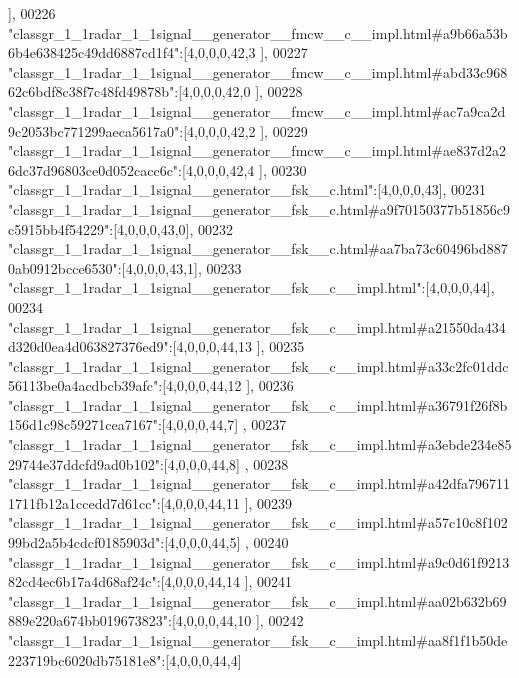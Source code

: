 \begin{DoxyCode}
      ],
00226 \textcolor{stringliteral}{"classgr\_1\_1radar\_1\_1signal\_\_generator\_\_fmcw\_\_c\_\_impl.html#a9b66a53b6b4e638425c49dd6887cd1f4"}:[4,0,0,0,42,3
      ],
00227 \textcolor{stringliteral}{"classgr\_1\_1radar\_1\_1signal\_\_generator\_\_fmcw\_\_c\_\_impl.html#abd33c96862c6bdf8c38f7c48fd49878b"}:[4,0,0,0,42,0
      ],
00228 \textcolor{stringliteral}{"classgr\_1\_1radar\_1\_1signal\_\_generator\_\_fmcw\_\_c\_\_impl.html#ac7a9ca2d9c2053bc771299aeca5617a0"}:[4,0,0,0,42,2
      ],
00229 \textcolor{stringliteral}{"classgr\_1\_1radar\_1\_1signal\_\_generator\_\_fmcw\_\_c\_\_impl.html#ae837d2a26dc37d96803ce0d052cacc6c"}:[4,0,0,0,42,4
      ],
00230 \textcolor{stringliteral}{"classgr\_1\_1radar\_1\_1signal\_\_generator\_\_fsk\_\_c.html"}:[4,0,0,0,43],
00231 \textcolor{stringliteral}{"classgr\_1\_1radar\_1\_1signal\_\_generator\_\_fsk\_\_c.html#a9f70150377b51856c9c5915bb4f54229"}:[4,0,0,0,43,0],
00232 \textcolor{stringliteral}{"classgr\_1\_1radar\_1\_1signal\_\_generator\_\_fsk\_\_c.html#aa7ba73c60496bd8870ab0912bcce6530"}:[4,0,0,0,43,1],
00233 \textcolor{stringliteral}{"classgr\_1\_1radar\_1\_1signal\_\_generator\_\_fsk\_\_c\_\_impl.html"}:[4,0,0,0,44],
00234 \textcolor{stringliteral}{"classgr\_1\_1radar\_1\_1signal\_\_generator\_\_fsk\_\_c\_\_impl.html#a21550da434d320d0ea4d063827376ed9"}:[4,0,0,0,44,13
      ],
00235 \textcolor{stringliteral}{"classgr\_1\_1radar\_1\_1signal\_\_generator\_\_fsk\_\_c\_\_impl.html#a33c2fc01ddc56113be0a4acdbcb39afc"}:[4,0,0,0,44,12
      ],
00236 \textcolor{stringliteral}{"classgr\_1\_1radar\_1\_1signal\_\_generator\_\_fsk\_\_c\_\_impl.html#a36791f26f8b156d1c98c59271cea7167"}:[4,0,0,0,44,7]
      ,
00237 \textcolor{stringliteral}{"classgr\_1\_1radar\_1\_1signal\_\_generator\_\_fsk\_\_c\_\_impl.html#a3ebde234e8529744e37ddcfd9ad0b102"}:[4,0,0,0,44,8]
      ,
00238 \textcolor{stringliteral}{"classgr\_1\_1radar\_1\_1signal\_\_generator\_\_fsk\_\_c\_\_impl.html#a42dfa7967111711fb12a1ccedd7d61cc"}:[4,0,0,0,44,11
      ],
00239 \textcolor{stringliteral}{"classgr\_1\_1radar\_1\_1signal\_\_generator\_\_fsk\_\_c\_\_impl.html#a57c10c8f10299bd2a5b4cdcf0185903d"}:[4,0,0,0,44,5]
      ,
00240 \textcolor{stringliteral}{"classgr\_1\_1radar\_1\_1signal\_\_generator\_\_fsk\_\_c\_\_impl.html#a9c0d61f921382cd4ec6b17a4d68af24c"}:[4,0,0,0,44,14
      ],
00241 \textcolor{stringliteral}{"classgr\_1\_1radar\_1\_1signal\_\_generator\_\_fsk\_\_c\_\_impl.html#aa02b632b69889e220a674bb019673823"}:[4,0,0,0,44,10
      ],
00242 \textcolor{stringliteral}{"classgr\_1\_1radar\_1\_1signal\_\_generator\_\_fsk\_\_c\_\_impl.html#aa8f1f1b50de223719bc6020db75181e8"}:[4,0,0,0,44,4]

\end{DoxyCode}

